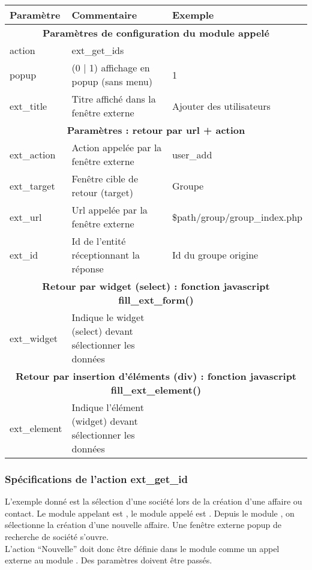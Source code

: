 \begin{tabular}{|p{2.5cm}|p{6cm}|p{4.5cm}|}
\hline
\textbf{Paramètre} & \textbf{Commentaire} & \textbf{Exemple} \\
\hline
\multicolumn{3}{|c|}{\textbf{Paramètres de configuration du module appelé}}\\
\hline
action & ext\_get\_ids & \\
\hline
popup & (0 | 1) affichage en popup (sans menu) & 1 \\
\hline
ext\_title & Titre affiché dans la fenêtre externe & Ajouter des utilisateurs\\
\hline
\multicolumn{3}{|c|}{\textbf{Paramètres : retour par url + action}}\\
\hline
ext\_action & Action appelée par la fenêtre externe & user\_add\\
\hline
ext\_target & Fenêtre cible de retour (target) & Groupe \\
\hline
ext\_url & Url appelée par la fenêtre externe & \$path/group/group\_index.php \\
\hline
ext\_id & Id de l'entité réceptionnant la réponse & Id du groupe origine \\
\hline
\multicolumn{3}{|c|}{\textbf{Retour par widget (select) : fonction javascript fill\_ext\_form() }}\\
\hline
ext\_widget & Indique le widget (select) devant sélectionner les données & \\
\hline
\multicolumn{3}{|c|}{\textbf{Retour par insertion d'éléments (div) : fonction javascript fill\_ext\_element() }}\\
\hline
ext\_element & Indique l'élément (widget) devant sélectionner les données & \\
\hline
\end{tabular}


\subsubsection{Spécifications de l'action ext\_get\_id}

L'exemple donné est la sélection d'une société lors de la création d'une affaire ou contact.
Le module appelant est \deal, le module appelé est \company.
Depuis le module \deal, on sélectionne la création d'une nouvelle affaire. Une fenêtre externe popup de recherche de société s'ouvre.\\

L'action ``Nouvelle'' doit donc être définie dans le module \deal comme un appel externe au module \company.
Des paramètres doivent être passés.\\

